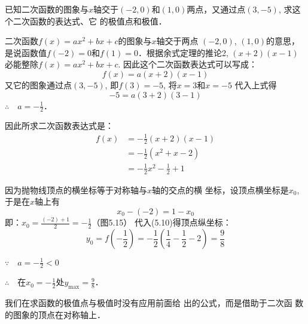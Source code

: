 \begin{example}
    已知二次函数的图象与$x$轴交于$(-2,0)$和$(1,
0)$两点，又通过点$(3,-5)$, 求这个二次函数的表达式、它
的极值点和极值．
\end{example}

\begin{solution}
二次函数$f(x)=ax^2+bx+c$的图象与$x$轴交于两点
$(-2,0)$, $(1,0)$的意思，是说函数值$f(-2)=0$和$f(1)=
0$．根据余式定理的推论2, $(x+2)(x-1)$必能整除$f(x)=
ax^2+bx+c$. 因此这个二次函数表达式可以写成：
\[f(x)=a(x+2)(x-1)\]
又它的图象通过点$(3,-5)$, 即$f(3)=-5$, 将$x=3$和$x=-5$
代入上式得
\[-5=a(3+2)(3-1)\]
$\therefore\quad a=-\frac{1}{2}$．

因此所求二次函数表达式是：
\begin{equation}
    \begin{split}
        f(x)&=-\frac{1}{2}(x+2)(x-1)\\
        &=-\frac{1}{2}(x^2+x-2)\\
        &=-\frac{1}{2}x^2-\frac{1}{2}+1
    \end{split}
\end{equation}

因为抛物线顶点的横坐标等于对称轴与$x$轴的交点的横
坐标，设顶点横坐标是$x_0$, 于是在$x$轴上有
    \[x_0-(-2)=1-x_0\]
    即：$x_0=\frac{(-2)+1}{2}=-\frac{1}{2}$（图5.15）
代入(5.10)得顶点纵坐标：
\[y_0=f\left(-\frac{1}{2}\right)=-\frac{1}{2}\left(\frac{1}{4}-\frac{1}{2}-2\right)=\frac{9}{8}\]

$\because\quad a=-\frac{1}{2}<0$

$\therefore\quad $在$x_0=-\frac{1}{2}$处$y_{\max}=\frac{9}{8}$．

\begin{figure}[htp]
    \centering

    \caption{}
\end{figure}
\end{solution}

\begin{rmk}
    我们在求函数的极值点与极值时没有应用前面给
出的公式，而是借助于二次函
数的图象的顶点在对称轴上．
\end{rmk}

